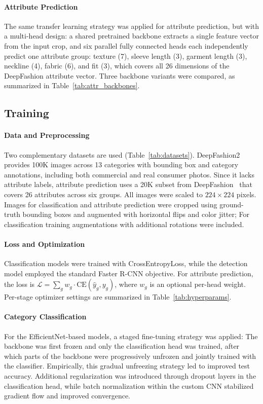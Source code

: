 \documentclass{article}
\begin{document}
\paragraph{Attribute Prediction}
The same transfer learning strategy was applied for attribute prediction, but with a multi-head design: a shared pretrained backbone extracts a single feature vector from the input crop, and six parallel fully connected heads each independently predict one attribute group: texture (7), sleeve length (3), garment length (3), neckline (4), fabric (6), and fit (3), which covers all 26 dimensions of the DeepFashion attribute vector. Three backbone variants were compared, as summarized in Table~\ref{tab:attr_backbones}.

\subsection{Training}
\paragraph{Data and Preprocessing}
Two complementary datasets are used (Table~\ref{tab:datasets}). DeepFashion2~\cite{ge2019deepfashion2} provides 100K images across 13 categories with bounding box and category annotations, including both commercial and real consumer photos. Since it lacks attribute labels, attribute prediction uses a 20K subset from DeepFashion~\cite{liu2016deepfashion} that covers 26 attributes across six groups. All images were scaled to $224\times224$ pixels. Images for classification and attribute prediction were cropped using ground-truth bounding boxes and augmented with horizontal flips and color jitter; For classification training augmentations with additional rotations were included.

\paragraph{Loss and Optimization}
Classification models were trained with CrossEntropyLoss, while the detection model employed the standard Faster R-CNN objective. For attribute prediction, the loss is $\mathcal{L} = \sum_{g} w_g \cdot \mathrm{CE}(\hat{y}_g, y_g)$, where $w_g$ is an optional per-head weight. Per-stage optimizer settings are summarized in Table~\ref{tab:hyperparams}.

\paragraph{Category Classification}
For the EfficientNet-based models, a staged fine-tuning strategy was applied: The backbone was first frozen and only the classification head was trained, after which parts of the backbone were progressively unfrozen and jointly trained with the classifier. Empirically, this gradual unfreezing strategy led to improved test accuracy. Additional regularization was introduced through dropout layers in the classification head, while batch normalization within the custom CNN stabilized gradient flow and improved convergence.
\end{document}
